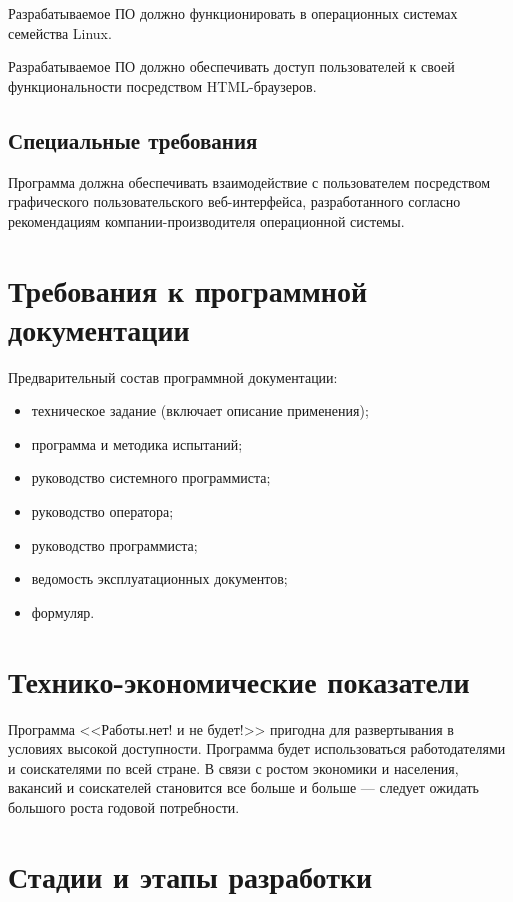 \documentclass[a4page]{article}
\begin{document}
Разрабатываемое ПО должно функционировать в операционных системах семейства Linux.

Разрабатываемое ПО должно обеспечивать доступ пользователей к своей функциональности посредством HTML-браузеров.

\subsection{Специальные требования}

Программа должна обеспечивать взаимодействие с пользователем посредством графического пользовательского веб-интерфейса, разработанного согласно рекомендациям компании-производителя операционной системы.

\section{Требования к программной документации}

Предварительный состав программной документации:

\begin{itemize}
  \item техническое задание (включает описание применения);
  \item программа и методика испытаний;
  \item руководство системного программиста;
  \item руководство оператора;
  \item руководство программиста;
  \item ведомость эксплуатационных документов;
  \item формуляр.
\end{itemize}

\section{Технико-экономические показатели}

Программа <<Работы.нет! и не будет!>> пригодна для развертывания в условиях высокой доступности. Программа будет использоваться работодателями и соискателями по всей стране. В связи с ростом экономики и населения, вакансий и соискателей становится все больше и больше --- следует ожидать большого роста годовой потребности.

\section{Стадии и этапы разработки}
\end{document}
